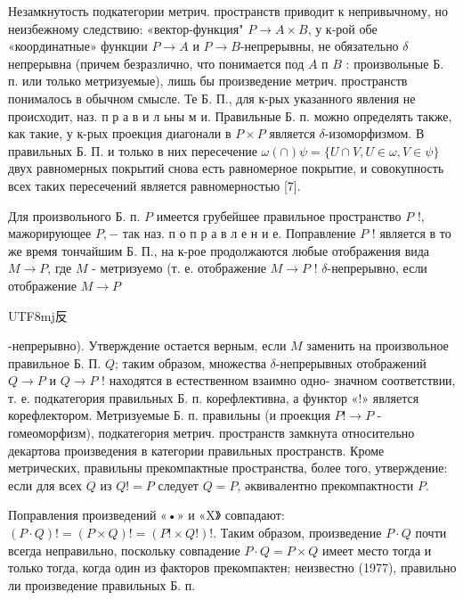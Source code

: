 \documentclass[10pt]{article}
\begin{document}
Незамкнутость подкатегории метрич. пространств приводит к непривычному, но неизбежному следствию: «вектор-функция" $P \rightarrow A \times B$, у к-рой обе «координатные» функции $P \rightarrow A$ и $P \rightarrow B$-непрерывны, не обязательно $\delta$ непрерывна (причем безразлично, что понимается под $A$ п $B$ : произвольные Б. п. или только метризуемые), лишь бы произведение метрич. пространств понималось в обычном смысле. Те Б. П., для к-рых указанного явления не происходит, наз. п р а в и л ьны м и. Правильные Б. п. можно определять также, как такие, у к-рых проекция диагонали в $P \times P$ является $\delta$-изоморфизмом. В правильных Б. П. и только в них пересечение $\omega(\cap) \psi=\{U \cap V, U \in \omega, V \in \psi\}$ двух равномерных покрытий снова есть равномерное покрытие, и совокупность всех таких пересечений является равномерностью [7].



Для произвольного Б. п. $P$ имеется грубейшее правильное пространство $P$ !, мажорирующее $P,-$ так наз. п о п р а в л е н и е. Поправление $P$ ! является в то же время тончайшим Б. П., на к-рое продолжаются любые отображения вида $M \rightarrow P$, где $M$ - метризуемо (т. е. отображение $M \rightarrow P$ ! $\delta$-непрерывно, если отображение $M \rightarrow P$ \begin{CJK}{UTF8}{mj}反\end{CJK}-непрерывно). Утверждение остается верным, если $M$ заменить на произвольное правильное Б. П. $Q$; таким образом, множества $\delta$-непрерывных отображений $Q \rightarrow P$ и $Q \rightarrow P$ ! находятся в естественном взаимно одно- значном соответствии, т. е. подкатегория правильных Б. п. корефлективна, а функтор «!» является корефлектором. Метризуемые Б. п. правильны (и проекция $P ! \rightarrow P$ - гомеоморфизм), подкатегория метрич. пространств замкнута относительно декартова произведения в категории правильных пространств. Кроме метрических, правильны прекомпактные пространства, более того, утверждение: если для всех $Q$ из $Q !=P$ следует $Q=P$, әквивалентно прекомпактности $P$.



Поправления произведений «•» и «X》 совпадают: $(P \cdot Q) !=(P \times Q) !=(P ! \times Q !) !$. Таким образом, произведение $P \cdot Q$ почти всегда неправильно, поскольку совпадение $P \cdot Q=P \times Q$ имеет место тогда и только тогда, когда один из факторов прекомпактен; неизвестно (1977), правильно ли произведение правильных Б. п.
\end{document}
